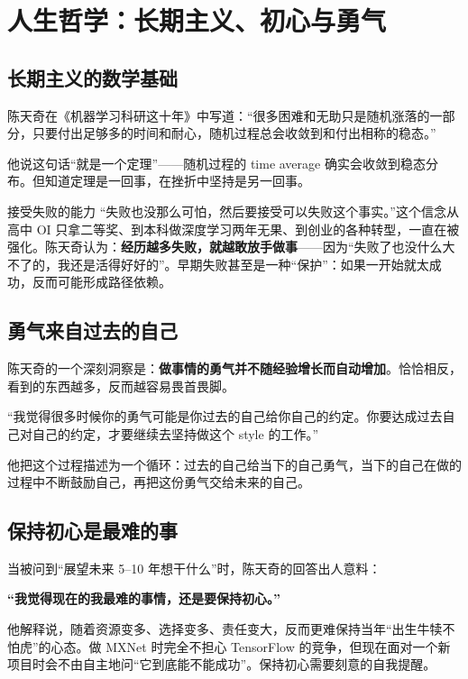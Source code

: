 \documentclass[a4paper]{article}
\begin{document}
\section{人生哲学：长期主义、初心与勇气}

\subsection{长期主义的数学基础}

陈天奇在《机器学习科研这十年》中写道：``很多困难和无助只是随机涨落的一部分，只要付出足够多的时间和耐心，随机过程总会收敛到和付出相称的稳态。''

他说这句话``就是一个定理''------随机过程的 time average 确实会收敛到稳态分布。但知道定理是一回事，在挫折中坚持是另一回事。

\begin{importantbox}{接受失败的能力}
``失败也没那么可怕，然后要接受可以失败这个事实。''这个信念从高中 OI 只拿二等奖、到本科做深度学习两年无果、到创业的各种转型，一直在被强化。陈天奇认为：\textbf{经历越多失败，就越敢放手做事}------因为``失败了也没什么大不了的，我还是活得好好的''。早期失败甚至是一种``保护''：如果一开始就太成功，反而可能形成路径依赖。
\end{importantbox}

\subsection{勇气来自过去的自己}

陈天奇的一个深刻洞察是：\textbf{做事情的勇气并不随经验增长而自动增加}。恰恰相反，看到的东西越多，反而越容易畏首畏脚。

``我觉得很多时候你的勇气可能是你过去的自己给你自己的约定。你要达成过去自己对自己的约定，才要继续去坚持做这个 style 的工作。''

他把这个过程描述为一个循环：过去的自己给当下的自己勇气，当下的自己在做的过程中不断鼓励自己，再把这份勇气交给未来的自己。

\subsection{保持初心是最难的事}

当被问到``展望未来 5--10 年想干什么''时，陈天奇的回答出人意料：

\textbf{``我觉得现在的我最难的事情，还是要保持初心。''}

他解释说，随着资源变多、选择变多、责任变大，反而更难保持当年``出生牛犊不怕虎''的心态。做 MXNet 时完全不担心 TensorFlow 的竞争，但现在面对一个新项目时会不由自主地问``它到底能不能成功''。保持初心需要刻意的自我提醒。
\end{document}
